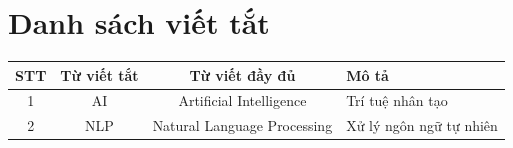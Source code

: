 \newpage
{\centering \section*{Danh sách viết tắt}} %

\begin{table}[ht]
\centering
\begin{tabular}{|c|c|c|l|}
\hline
\textbf{STT} & \textbf{Từ viết tắt} & \textbf{Từ viết đầy đủ} & \textbf{Mô tả} \\ \hline
1 & AI & Artificial Intelligence & Trí tuệ nhân tạo \\ \hline
2 & NLP & Natural Language Processing & Xử lý ngôn ngữ tự nhiên \\ \hline
\end{tabular}
\end{table}

\newpage
